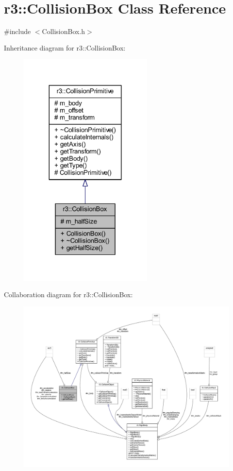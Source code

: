 \hypertarget{classr3_1_1_collision_box}{}\section{r3\+:\+:Collision\+Box Class Reference}
\label{classr3_1_1_collision_box}


{\ttfamily \#include $<$Collision\+Box.\+h$>$}



Inheritance diagram for r3\+:\+:Collision\+Box\+:\nopagebreak
\begin{figure}[H]
\begin{center}
\leavevmode
\includegraphics[width=191pt]{classr3_1_1_collision_box__inherit__graph}
\end{center}
\end{figure}


Collaboration diagram for r3\+:\+:Collision\+Box\+:\nopagebreak
\begin{figure}[H]
\begin{center}
\leavevmode
\includegraphics[width=350pt]{classr3_1_1_collision_box__coll__graph}
\end{center}
\end{figure}
